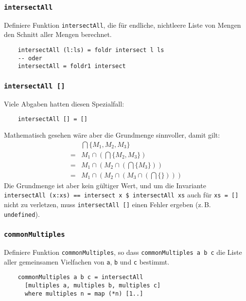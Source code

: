 \documentclass{beamer}
\begin{document}
\begin{frame}[fragile]
  \frametitle{\lstinline{intersectAll}}
  Definiere Funktion \lstinline{intersectAll}, die für endliche, nichtleere Liste von Mengen den Schnitt aller Mengen berechnet.
  \pause
  \begin{lstlisting}
    intersectAll (l:ls) = foldr intersect l ls
    -- oder
    intersectAll = foldr1 intersect
  \end{lstlisting}
\end{frame}

\begin{frame}[fragile]
  \frametitle{\lstinline{intersectAll []}}
  Viele Abgaben hatten diesen Spezialfall:
  \begin{lstlisting}
    intersectAll [] = []
  \end{lstlisting}
  Mathematisch gesehen wäre aber die Grundmenge sinnvoller, damit gilt:
  \begin{align*}
    & \bigcap \{ M_1, M_2, M_3 \} \\
    = & M_1 \cap \left(\bigcap \{ M_2, M_3 \}\right) \\
    = & M_1 \cap \left(M_2 \cap \left(\bigcap \{ M_3 \}\right)\right) \\
    = & M_1 \cap \left(M_2 \cap \left(M_3 \cap \left(\bigcap \{\}\right)\right)\right)
  \end{align*}
  Die Grundmenge ist aber kein gültiger Wert,
  und um die Invariante \lstinline{intersectAll (x:xs) == intersect x $ intersectAll xs} auch für \lstinline{xs = []} nicht zu verletzen,
  muss \lstinline{intersectAll []} einen Fehler ergeben
  (z.\,B. \lstinline{undefined}).
\end{frame}

\begin{frame}[fragile]
  \frametitle{\lstinline{commonMultiples}}
  Definiere Funktion \lstinline{commonMultiples}, so dass \lstinline{commonMultiples a b c} die Liste aller gemeinsamen Vielfachen von \lstinline{a}, \lstinline{b} und \lstinline{c} bestimmt.
  \pause
  \begin{lstlisting}
    commonMultiples a b c = intersectAll
      [multiples a, multiples b, multiples c]
      where multiples n = map (*n) [1..]
  \end{lstlisting}
\end{frame}
\end{document}
